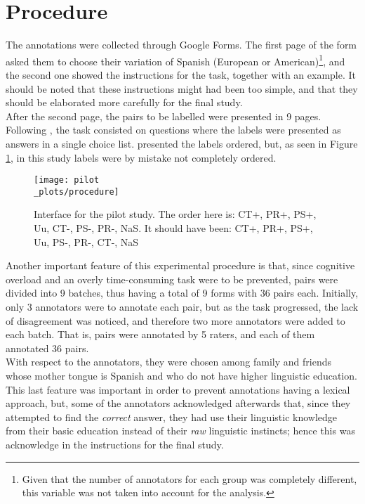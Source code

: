 \section{Procedure}
\label{sec:pilproc}

The annotations were collected through Google Forms. The first page of the form asked them to choose their variation of Spanish (European or American)\footnote{Given that the number of annotators for each group was completely different, this variable was not taken into account for the analysis.}, and the second one showed the instructions for the task, together with an example. It should be noted that these instructions might had been too simple, and that they should be elaborated more carefully for the final study.\\

After the second page, the pairs to be labelled were presented in 9 pages. Following \citet{de2012did}, the task consisted on questions where the labels were presented as answers in a single choice list. \citet{de2012did} presented the labels ordered, but, as seen in Figure \ref{fig:proc}, in this study labels were by mistake not completely ordered.\\ 

\begin{figure}
\centering
\parbox{12.5cm}{\texttt{[image: pilot\\\_plots/procedure]}
\caption[Interface for the pilot study.]{Interface for the pilot study. The order here is: CT+, PR+, PS+, Uu, CT-, PS-, PR-, NaS. It should have been: CT+, PR+, PS+, Uu, PS-, PR-, CT-, NaS}\label{fig:proc}}
\qquad
\end{figure}


Another important feature of this experimental procedure is that, since cognitive overload and an overly time-consuming task were to be prevented, pairs were divided into 9 batches, thus having a total of 9 forms with 36 pairs each. Initially, only 3 annotators were to annotate each pair, but as the task progressed, the lack of disagreement was noticed, and therefore two more annotators were added to each batch. That is, pairs were annotated by 5 raters, and each of them annotated 36 pairs.\\

With respect to the annotators, they were chosen among family and friends whose mother tongue is Spanish and who do not have higher linguistic education. This last feature was important in order to prevent annotations having a lexical approach, but, some of the annotators acknowledged afterwards that, since they attempted to find the \textit{correct} answer, they had use their linguistic knowledge from their basic education instead of their \textit{raw} linguistic instincts; hence this was acknowledge in the instructions for the final study.\\

